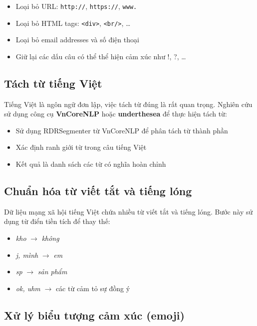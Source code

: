 \documentclass[14pt, a4paper]{report}
\begin{document}
\begin{itemize}
    \item Loại bỏ URL: \texttt{http://}, \texttt{https://}, \texttt{www.}
    \item Loại bỏ HTML tags: \texttt{<div>}, \texttt{<br/>}, \ldots
    \item Loại bỏ email addresses và số điện thoại
    \item Giữ lại các dấu câu có thể thể hiện cảm xúc như !, ?, \ldots
\end{itemize}

\subsection{Tách từ tiếng Việt}

Tiếng Việt là ngôn ngữ đơn lập, việc tách từ đúng là rất quan trọng. Nghiên cứu sử dụng công cụ \textbf{VnCoreNLP} hoặc \textbf{underthesea} để thực hiện tách từ:

\begin{itemize}
    \item Sử dụng RDRSegmenter từ VnCoreNLP để phân tách từ thành phần
    \item Xác định ranh giới từ trong câu tiếng Việt
    \item Kết quả là danh sách các từ có nghĩa hoàn chỉnh
\end{itemize}

\subsection{Chuẩn hóa từ viết tắt và tiếng lóng}

Dữ liệu mạng xã hội tiếng Việt chứa nhiều từ viết tắt và tiếng lóng. Bước này sử dụng từ điển tiền tích để thay thế:

\begin{itemize}
    \item \textit{kho} $\rightarrow$ \textit{không}
    \item \textit{j, mình} $\rightarrow$ \textit{em}
    \item \textit{sp} $\rightarrow$ \textit{sản phẩm}
    \item \textit{ok, uhm} $\rightarrow$ các từ cảm tỏ sự đồng ý
\end{itemize}

\subsection{Xử lý biểu tượng cảm xúc (emoji)}
\end{document}
